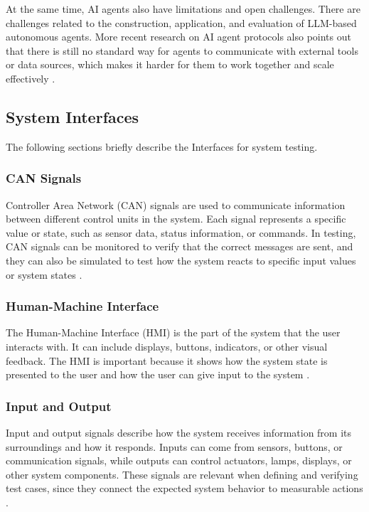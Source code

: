 \documentclass[a4paper,12pt]{article}
\begin{document}
At the same time, AI agents also have limitations and open challenges. There are challenges related to the construction, application, and evaluation of LLM-based autonomous agents\cite{wang2024survey}. More recent research on AI agent protocols also points out that there is still no standard way for agents to communicate with external tools or data sources, which makes it harder for them to work together and scale effectively \cite{yang2025survey}.


\subsection{System Interfaces}
The following sections briefly describe the Interfaces for system testing.

\subsubsection{CAN Signals}
Controller Area Network (CAN) signals are used to communicate information between different control units in the system. Each signal represents a specific value or state, such as sensor data, status information, or commands. In testing, CAN signals can be monitored to verify that the correct messages are sent, and they can also be simulated to test how the system reacts to specific input values or system states \cite{schneider_io}.

\subsubsection{Human-Machine Interface}
The Human-Machine Interface (HMI) is the part of the system that the user interacts with. It can include displays, buttons, indicators, or other visual feedback. The HMI is important because it shows how the system state is presented to the user and how the user can give input to the system \cite{nist_hmi}.

\subsubsection{Input and Output}
Input and output signals describe how the system receives information from its surroundings and how it responds. Inputs can come from sensors, buttons, or communication signals, while outputs can control actuators, lamps, displays, or other system components. These signals are relevant when defining and verifying test cases, since they connect the expected system behavior to measurable actions \cite{schneider_io}.
\end{document}
